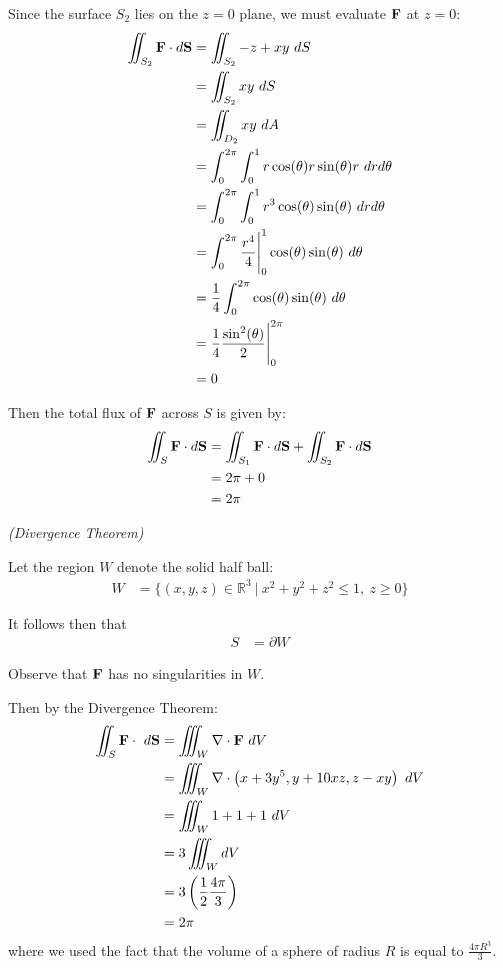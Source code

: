 \begin{solution}
    Since the surface \(S_2\) lies on the \(z = 0\) plane, we must evaluate \(\vb{F}\) at \(z = 0\):
    \begin{align*}
        \iint_{S_2} \vb{F} \cdot d\vb{S} &= \iint_{S_2} -z + xy \ dS \\
        &= \iint_{S_2} xy \ dS \\
        &= \iint_{D_2} xy \ dA \\
        &= \int_{0}^{2\pi} \int_0^1 r\cos(\theta) r\sin(\theta) r \ drd\theta \\
        &= \int_{0}^{2\pi} \int_0^1 r^3\cos(\theta) \sin(\theta) \ drd\theta \\
        &= \int_{0}^{2\pi} \frac{r^4}{4} \Biggr|_0^1 \cos(\theta) \sin(\theta) \ d\theta \\
        &= \frac{1}{4} \int_{0}^{2\pi} \cos(\theta) \sin(\theta) \ d\theta \\
        &= \frac{1}{4} \frac{\sin^2(\theta)}{2}\Biggr|_{0}^{2\pi} \\
        &= 0
    \end{align*}
    
    Then the total flux of \(\vb{F}\) across \(S\) is given by:
    \begin{align*}
        \iint_S \vb{F} \cdot d\vb{S} &= \iint_{S_1} \vb{F} \cdot d\vb{S} + \iint_{S_2} \vb{F} \cdot d\vb{S} \\
        &= 2\pi + 0 \\
        &= 2\pi
    \end{align*}
\end{solution}

\begin{solution}
    \textit{(Divergence Theorem)}
    
    Let the region \(W\) denote the solid half ball:
    \begin{align}
        W &= \{(x, y, z) \in \mathbb{R}^3 \ | \ x^2 + y^2 + z^2 \leq 1, \ z \geq 0\}
    \end{align} 
    
    It follows then that
    \begin{align}
        S &= \partial W
    \end{align}

    Observe that \(\vb{F}\) has no singularities in \(W\).

    Then by the Divergence Theorem:
    \begin{align*}
        \iint_S \vb{F} \cdot \ d\vb{S} &= \iiint_W \nabla \cdot \vb{F} \ dV \\
        &= \iiint_W \nabla \cdot \left(x + 3y^5, y + 10xz, z - xy\right) \ dV \\
        &= \iiint_W 1 + 1 + 1 \ dV \\
        &= 3 \iiint_W dV \\
        &= 3 \left(\frac{1}{2}\frac{4\pi}{3}\right) \\
        &= 2\pi
    \end{align*}
    where we used the fact that the volume of a sphere of radius \(R\) is equal to \(\frac{4\pi R^3}{3}\).
\end{solution}